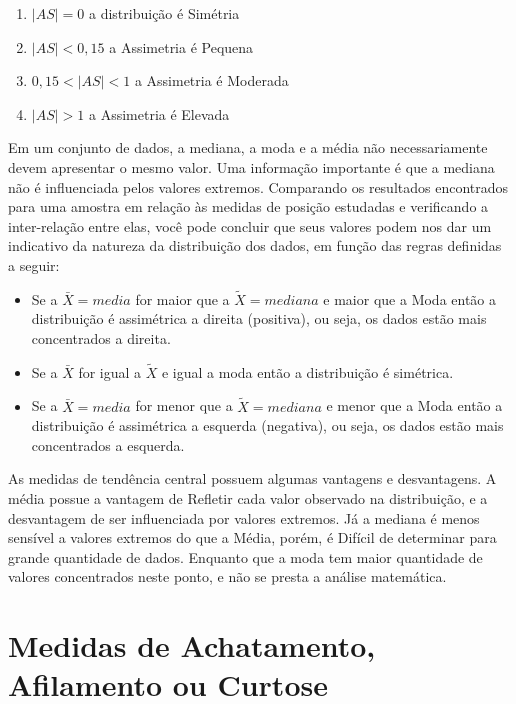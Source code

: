 \begin{enumerate}
\item $|AS| =0$ a distribuição é Simétria
\item $|AS| < 0,15$ a Assimetria é Pequena
\item $0,15 < |AS| <1$ a Assimetria é Moderada
\item $|AS| > 1$ a Assimetria é Elevada
\end{enumerate}


\newpage 

Em um conjunto de dados, a mediana, a moda e a média
não necessariamente devem apresentar o mesmo valor. Uma
informação importante é que a mediana não é influenciada pelos valores extremos. Comparando os resultados encontrados para uma amostra em relação às medidas de posição estudadas e verificando a inter-relação entre elas, você pode concluir que seus valores podem nos dar um indicativo da natureza da distribuição dos dados, em função das regras definidas a seguir:


\begin{itemize}
\item Se a $\bar{X}=media$ for maior que a $\tilde{X}=mediana$ e maior que a Moda então a distribuição é assimétrica a direita (positiva), ou seja, os dados estão mais concentrados a direita.  	
\item Se a $\bar{X}$ for igual a $\tilde{X}$ e igual a moda então a distribuição é simétrica.
\item Se a $\bar{X}= media$ for menor que a $\tilde{X}= mediana$ e menor que a Moda então a distribuição é assimétrica a esquerda (negativa), ou seja, os dados estão mais concentrados a esquerda. 	
\end{itemize}

As medidas de tendência  central possuem algumas vantagens e desvantagens. A média possue a vantagem de Refletir cada valor observado na distribuição, e a desvantagem de ser influenciada por valores extremos. Já a mediana é menos sensível a valores extremos do que a Média, porém, é Difícil de determinar para grande quantidade de dados. Enquanto que a moda tem maior quantidade de valores concentrados neste ponto, e não se presta a análise matemática.
 
\newpage 

\section{Medidas de Achatamento, Afilamento ou Curtose }

